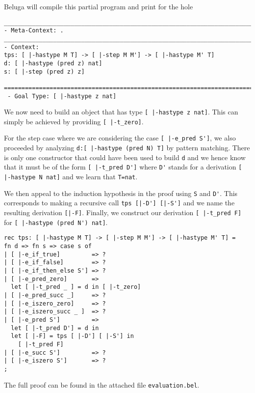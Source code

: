 Beluga will compile this partial program and print for the hole

\begin{lstlisting}
________________________________________________________________________________
- Meta-Context: .
________________________________________________________________________________
- Context:
tps: [ |-hastype M T] -> [ |-step M M'] -> [ |-hastype M' T]
d: [ |-hastype (pred z) nat]
s: [ |-step (pred z) z]

================================================================================
 - Goal Type: [ |-hastype z nat]

\end{lstlisting}



We now need to build an object that has type
\lstinline![ |-hastype z nat]!. This can simply be achieved by
providing
\lstinline![ |-t_zero]!.


For the step case where we are considering the case
\lstinline![ |-e_pred S']!, we also proceeded by analyzing
\lstinline!d:[ |-hastype (pred N) T]! by pattern matching. There is
only one constructor that could have been used to build \lstinline!d!
and we hence know that it must be of the form
\lstinline![ |-t_pred D']! where \lstinline!D'! stands for a
derivation
\lstinline![ |-hastype N nat]! and we learn that \lstinline!T=nat!.

We then appeal to the induction hypothesis in the proof
using \lstinline!S! and \lstinline!D'!. This corresponds to making a
recursive call \lstinline!tps [|-D'] [|-S']! and we name the resulting
derivation \lstinline![|-F]!. Finally, we construct our derivation
\lstinline![ |-t_pred F]! for \lstinline![ |-hastype (pred N') nat]!.

\begin{lstlisting}
rec tps: [ |-hastype M T] -> [ |-step M M'] -> [ |-hastype M' T] =
fn d => fn s => case s of
| [ |-e_if_true]         => ?
| [ |-e_if_false]        => ?
| [ |-e_if_then_else S'] => ?
| [ |-e_pred_zero]       =>
  let [ |-t_pred _ ] = d in [ |-t_zero]
| [ |-e_pred_succ _]     => ?
| [ |-e_iszero_zero]     => ?
| [ |-e_iszero_succ _ ]  => ?
| [ |-e_pred S']         =>
  let [ |-t_pred D'] = d in
  let [ |-F] = tps [ |-D'] [ |-S'] in
    [ |-t_pred F]
| [ |-e_succ S']         => ?
| [ |-e_iszero S']       => ?
;
\end{lstlisting}

The full proof can be found in the attached file \lstinline!evaluation.bel!.

